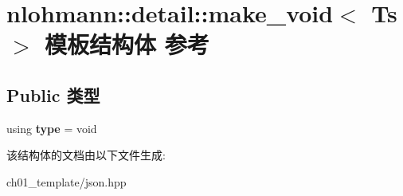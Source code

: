 \hypertarget{structnlohmann_1_1detail_1_1make__void}{}\section{nlohmann\+::detail\+::make\+\_\+void$<$ Ts $>$ 模板结构体 参考}
\label{structnlohmann_1_1detail_1_1make__void}
\subsection*{Public 类型}
\begin{DoxyCompactItemize}
\item 
\mbox{\label{structnlohmann_1_1detail_1_1make__void_a8961e24ae3b2cb65ec47d1ce805d94e4}} 
using {\bfseries type} = void
\end{DoxyCompactItemize}


该结构体的文档由以下文件生成\+:\begin{DoxyCompactItemize}
\item 
ch01\+\_\+template/json.\+hpp\end{DoxyCompactItemize}
